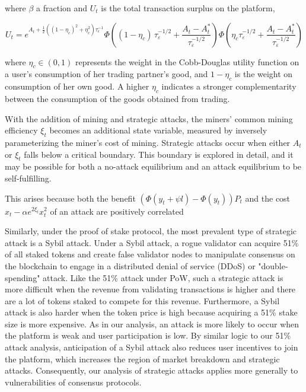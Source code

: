 where $\beta$ a fraction and $U_t$ is the total transaction surplus on the platform,

\begin{equation}
    U_{t}=e^{A_{t}+\frac{1}{2}((1-\eta_{c})^{2}+\eta_{c}^{2})\tau_{\epsilon}^{-1}}\Phi\left((1-\eta_{c})\,\tau_{\varepsilon}^{-1/2}+\frac{A_{t}-A_{t}^{*}}{\tau_{\varepsilon}^{-1/2}}\right)\Phi\left(\eta_{c}\tau_{\varepsilon}^{-1/2}+\frac{A_{t}-A_{t}^{*}}{\tau_{\varepsilon}^{-1/2}}\right)
\end{equation}

where $\eta_{c} \in (0, 1)$ represents the weight in the Cobb-Douglas utility function on a user's consumption of her trading partner's good, and $1 - \eta_{c}$ is the weight on consumption of her own good. A higher $\eta_{c}$ indicates a stronger complementarity between the consumption of the goods obtained from trading.

With the addition of mining and strategic attacks, the miners' common mining efficiency $\xi_t$ becomes an additional state variable, measured by inversely parameterizing the miner's cost of mining. Strategic attacks occur when either $A_t$ or $\xi_t$ falls below a critical boundary.  This boundary is explored in detail, and it may be possible for both a no-attack equilibrium and an attack equilibrium to be self-fulfilling.

 This arises because both the benefit $\left(\Phi\left(y_{t}+\psi l\right)-\Phi\left(y_{t}\right)\right)P_{t}$ and the cost $x_{t} - {\alpha {e^{2\xi_{t}}}} x_{t}^{2}$
of an attack are positively correlated

Similarly, under the
proof of stake protocol, the most prevalent type of strategic attack is a Sybil attack. Under a Sybil
attack, a rogue validator can acquire 51\% of all staked tokens and create false validator nodes
to manipulate consensus on the blockchain to engage in a distributed denial of service (DDoS)
or "double-spending" attack. Like the 51\% attack under PoW, such a strategic attack is more
difficult when the revenue from validating transactions is higher and there are a lot of tokens
staked to compete for this revenue. Furthermore, a Sybil attack is also harder when the token price
is high because acquiring a 51\% stake size is more expensive. As in our analysis, an attack is more
likely to occur when the platform is weak and user participation is low. By similar logic to our
51\% attack analysis, anticipation of a Sybil attack also reduces user incentives to join the platform,
which increases the region of market breakdown and strategic attacks. Consequently, our analysis
of strategic attacks applies more generally to vulnerabilities of consensus protocols.

